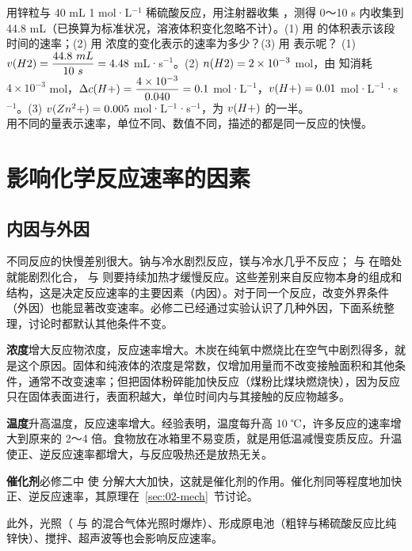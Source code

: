 \begin{liti}[基础]
用锌粒与 40 mL 1 mol·L$^{-1}$ 稀硫酸反应，用注射器收集 ，测得 0～10 s 内收集到  44.8 mL（已换算为标准状况，溶液体积变化忽略不计）。(1) 用  的体积表示该段时间的速率；(2) 用  浓度的变化表示的速率为多少？(3) 用  表示呢？
\tcblower
\jie (1) $v(\ce{H2})=\dfrac{44.8\ \mathrm{mL}}{10\ \mathrm{s}}=4.48$ mL·s$^{-1}$。(2) $n(H2)=2\times10^{-3}$ mol，由  知消耗  $4\times10^{-3}$ mol，$\Delta c(H+)=\dfrac{4\times10^{-3}}{0.040}=0.1$ mol·L$^{-1}$，$v(H+)=0.01$ mol·L$^{-1}$·s$^{-1}$。(3) $v(Zn^2+)=0.005$ mol·L$^{-1}$·s$^{-1}$，为 $v(H+)$ 的一半。\\
\dianbo 用不同的量表示速率，单位不同、数值不同，描述的都是同一反应的快慢。
\end{liti}

\section{影响化学反应速率的因素}

\subsection{内因与外因}
不同反应的快慢差别很大。钠与冷水剧烈反应，镁与冷水几乎不反应； 与  在暗处就能剧烈化合， 与  则要持续加热才缓慢反应。这些差别来自反应物本身的组成和结构，这是决定反应速率的主要因素（内因）。对于同一个反应，改变外界条件（外因）也能显著改变速率。必修二已经通过实验认识了几种外因，下面系统整理，讨论时都默认其他条件不变。

\textbf{浓度}\quad 增大反应物浓度，反应速率增大。木炭在纯氧中燃烧比在空气中剧烈得多，就是这个原因。固体和纯液体的浓度是常数，仅增加用量而不改变接触面积和其他条件，通常不改变速率；但把固体粉碎能加快反应（煤粉比煤块燃烧快），因为反应只在固体表面进行，表面积越大，单位时间内与其接触的反应物越多。

\textbf{温度}\quad 升高温度，反应速率增大。经验表明，温度每升高 10 ℃，许多反应的速率增大到原来的 2～4 倍。食物放在冰箱里不易变质，就是用低温减慢变质反应。升温使正、逆反应速率都增大，与反应吸热还是放热无关。

\textbf{催化剂}\quad 必修二中  使  分解大大加快，这就是催化剂的作用。催化剂同等程度地加快正、逆反应速率，其原理在~\ref{sec:02-mech}~节讨论。

此外，光照（ 与  的混合气体光照时爆炸）、形成原电池（粗锌与稀硫酸反应比纯锌快）、搅拌、超声波等也会影响反应速率。


